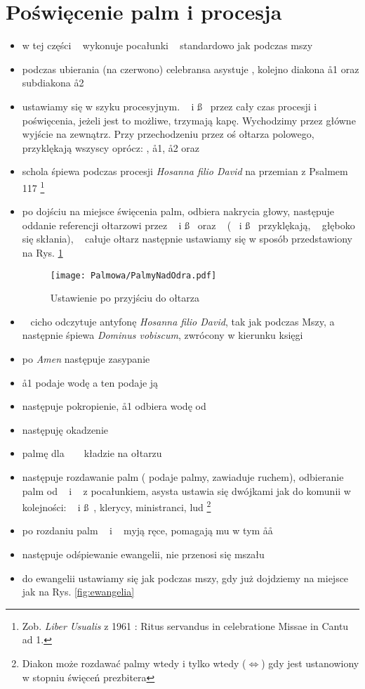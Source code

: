 \section{Poświęcenie palm i procesja}

\begin{itemize}
	\item w tej części \dd~ wykonuje pocałunki \ii~ standardowo jak podczas mszy
	\item podczas ubierania (na {\color{red} czerwono}) celebransa asystuje ,
	      kolejno diakona \aa1 oraz subdiakona \aa2
	\item ustawiamy się w szyku procesyjnym. \dd~ i \ss~ przez cały czas
	      procesji i poświęcenia, jeżeli jest to możliwe, trzymają kapę.
	      Wychodzimy przez główne wyjście na zewnątrz. Przy przechodzeniu przez
	      oś ołtarza polowego, przyklękają wszyscy oprócz: , \aa1, \aa2
	      oraz \ii
	\item schola śpiewa podczas procesji \textit{Hosanna filio David} na
	      przemian z Psalmem 117 \footnote{Zob. \textit{Liber Usualis} z 1961 :
		      Ritus servandus in celebratione Missae in Cantu ad 1.}
	\item po dojściu na miejsce święcenia palm,  odbiera nakrycia głowy,
	      następuje  oddanie referencji ołtarzowi przez \dd~ i \ss~ oraz \ii~
	      (\dd~ i \ss~ przyklękają, \ii~ głęboko się skłania), \ii~ całuje
	      ołtarz następnie ustawiamy się w sposób przedstawiony na Rys.
	      \ref{fig:przyjscie}

	      \begin{figure}[h]
		      \centering
		      \texttt{[image: Palmowa/PalmyNadOdra.pdf]}
		      \caption{Ustawienie po przyjściu do ołtarza}
		      \label{fig:przyjscie}
	      \end{figure}

	\item \ii~ cicho odczytuje antyfonę \textit{Hosanna filio David}, tak jak
	      podczas Mszy, a następnie śpiewa \textit{Dominus vobiscum}, zwrócony w
	      kierunku księgi
	\item po \textit{Amen} następuje zasypanie
	\item \aa1 podaje wodę  a ten podaje ją \dd
	\item następuje pokropienie, \aa1 odbiera wodę od \dd
	\item następuję okadzenie
	\item palmę dla \ii~ \dd~ kładzie na ołtarzu
	\item następuje rozdawanie palm ( podaje palmy,  zawiaduje ruchem),
	      odbieranie palm od \ii~ i \dd~ z pocałunkiem, asysta ustawia się
	      dwójkami jak do komunii w kolejności: \dd~ i \ss~, klerycy,
	      ministranci, lud \footnote{Diakon może rozdawać palmy wtedy i tylko
	      wtedy ($\iff$) gdy jest ustanowiony w stopniu święceń prezbitera}
	\item po rozdaniu palm \ii~ i \dd~ myją ręce, pomagają mu w tym \aa\aa
	\item następuje odśpiewanie ewangelii, nie przenosi się mszału
	\item do ewangelii ustawiamy się jak podczas mszy, gdy już dojdziemy na
	      miejsce jak na Rys. \ref{fig:ewangelia}


\end{itemize}
